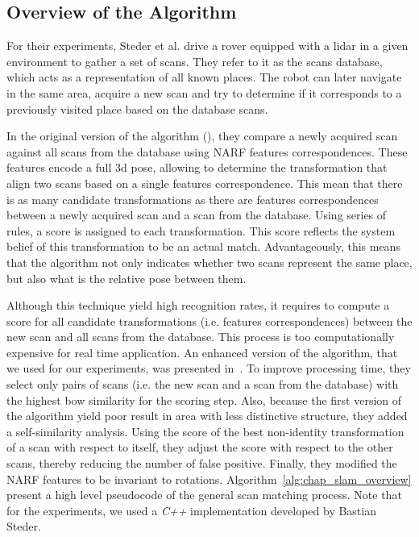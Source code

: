 \subsection{Overview of the Algorithm}
\label{ssec:chap_slam_algo}

For their experiments, Steder et al. drive a rover equipped with a \gls*{lidar} in a given environment to gather a set of scans. They refer to it as the scans database, which acts as a representation of all known places. The robot can later navigate in the same area, acquire a new scan and try to determine if it corresponds to a previously visited place based on the database scans. 

In the original version of the algorithm (\cite{Steder2010}), they compare a newly acquired scan against all scans from the database using NARF features correspondences. These features encode a full \gls*{3d} pose, allowing to determine the transformation that align two scans based on a single features correspondence. This mean that there is as many candidate transformations as there are features correspondences between a newly acquired scan and a scan from the database. Using series of rules, a score is assigned to each transformation. This score reflects the system belief of this transformation to be an actual match. Advantageously, this means that the algorithm not only indicates whether two scans represent the same place, but also what is the relative pose between them.

Although this technique yield high recognition rates, it requires to compute a score for all candidate transformations (i.e. features correspondences) between the new scan and all scans from the database. This process is too computationally expensive for real time application. An enhanced version of the algorithm, that we used for our experiments, was presented in~\cite{Steder2011b}. To improve processing time, they select only pairs of scans (i.e. the new scan and a scan from the database) with the highest \gls*{bow} similarity for the scoring step. Also, because the first version of the algorithm yield poor result in area with less distinctive structure, they added a self-similarity analysis. Using the score of the best non-identity transformation of a scan with respect to itself, they adjust the score with respect to the other scans, thereby reducing the number of false positive. Finally, they modified the NARF features to be invariant to rotations. Algorithm~\ref{alg:chap_slam_overview} present a high level pseudocode of the general scan matching process. Note that for the experiments, we used a \textit{C++} implementation developed by Bastian Steder.

